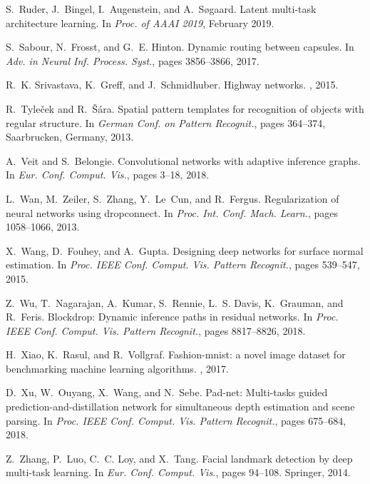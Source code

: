 \documentclass[10pt,twocolumn,letterpaper]{article}
\begin{document}
{\begin{thebibliography}{10}
S.~Ruder, J.~Bingel, I.~Augenstein, and A.~S{\o}gaard.
\newblock Latent multi-task architecture learning.
\newblock In {\em Proc. of AAAI 2019}, February 2019.

S.~Sabour, N.~Frosst, and G.~E. Hinton.
\newblock Dynamic routing between capsules.
\newblock In {\em Adv. in Neural Inf. Process. Syst.}, pages 3856--3866, 2017.

R.~K. Srivastava, K.~Greff, and J.~Schmidhuber.
\newblock Highway networks.
, 2015.

R.~Tyle{\v c}ek and R.~{\v S}{\' a}ra.
\newblock Spatial pattern templates for recognition of objects with regular
  structure.
\newblock In {\em German Conf. on Pattern Recognit.}, pages 364--374,
  Saarbrucken, Germany, 2013.

A.~Veit and S.~Belongie.
\newblock Convolutional networks with adaptive inference graphs.
\newblock In {\em Eur. Conf. Comput. Vis.}, pages 3--18, 2018.

L.~Wan, M.~Zeiler, S.~Zhang, Y.~Le~Cun, and R.~Fergus.
\newblock Regularization of neural networks using dropconnect.
\newblock In {\em Proc. Int. Conf. Mach. Learn.}, pages 1058--1066, 2013.

X.~Wang, D.~Fouhey, and A.~Gupta.
\newblock Designing deep networks for surface normal estimation.
\newblock In {\em Proc. IEEE Conf. Comput. Vis. Pattern Recognit.}, pages
  539--547, 2015.

Z.~Wu, T.~Nagarajan, A.~Kumar, S.~Rennie, L.~S. Davis, K.~Grauman, and
  R.~Feris.
\newblock Blockdrop: Dynamic inference paths in residual networks.
\newblock In {\em Proc. IEEE Conf. Comput. Vis. Pattern Recognit.}, pages
  8817--8826, 2018.

H.~Xiao, K.~Rasul, and R.~Vollgraf.
\newblock Fashion-mnist: a novel image dataset for benchmarking machine
  learning algorithms.
, 2017.

D.~Xu, W.~Ouyang, X.~Wang, and N.~Sebe.
\newblock Pad-net: Multi-tasks guided prediction-and-distillation network for
  simultaneous depth estimation and scene parsing.
\newblock In {\em Proc. IEEE Conf. Comput. Vis. Pattern Recognit.}, pages
  675--684, 2018.

Z.~Zhang, P.~Luo, C.~C. Loy, and X.~Tang.
\newblock Facial landmark detection by deep multi-task learning.
\newblock In {\em Eur. Conf. Comput. Vis.}, pages 94--108. Springer, 2014.

\end{thebibliography}
 }
\end{document}
